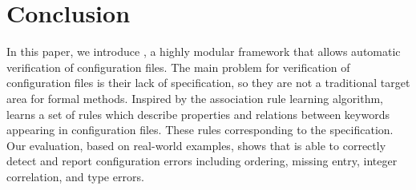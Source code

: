 
\section{Conclusion}

In this paper, we introduce \app, a highly modular framework 
that allows automatic verification of configuration files.
The main problem for verification of configuration files is their lack
of specification, so they are not a traditional target area
for formal methods.
Inspired by the association rule learning algorithm, \app learns 
a set of rules which describe properties and relations between keywords appearing in configuration files. These rules corresponding to the specification.
Our evaluation, based on real-world examples, shows that \app is able to
correctly detect and report configuration errors
including ordering, missing entry, integer correlation,
and type errors.

